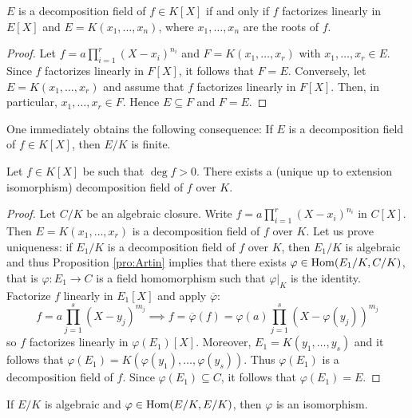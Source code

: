 \begin{proposition}
	$E$ is a decomposition field of $f\in K[X]$ if and only if
	$f$ factorizes linearly in $E[X]$ and $E=K(x_1,\dots,x_n)$, where 
	$x_1,\dots,x_n$ are the roots of $f$. 
\end{proposition}

\begin{proof}
    Let $f=a\prod_{i=1}^r(X-x_i)^{n_i}$ and $F=K(x_1,\dots,x_r)$ with $x_1,\dots,x_r\in E$. Since $f$
    factorizes linearly in $F[X]$, it follows that $F=E$. 
    Conversely, let $E=K(x_1,\dots,x_r)$ and assume that $f$ factorizes linearly
    in $F[X]$. Then, in particular, $x_1,\dots,x_r\in F$. Hence $E\subseteq F$ and
    $F=E$. 
\end{proof}

One immediately obtains the following consequence:
If $E$ is a decomposition field of $f\in K[X]$, then $E/K$ is finite. 

\begin{theorem}
    Let $f\in K[X]$ be such that $\deg f>0$. There exists a (unique up to extension isomorphism) 
    decomposition field of $f$ over $K$. 
\end{theorem}

\begin{proof}
    Let $C/K$ be an algebraic closure. Write $f=a\prod_{i=1}^r(X-x_i)^{n_i}$ in $C[X]$. 
    Then $E=K(x_1,\dots,x_r)$ is a decomposition field of $f$ over $K$. Let us prove
    uniqueness: if $E_1/K$ is a decomposition field of $f$ over $K$, 
    then $E_1/K$ is algebraic and thus Proposition
    \ref{pro:Artin} implies that 
    there exists $\varphi\in\operatorname{Hom}(E_1/K,C/K)$, that is $\varphi\colon E_1\to C$ is a field
    homomorphism such that $\varphi|_K$ is the identity.
    Factorize $f$ linearly in $E_1[X]$ and apply $\overline{\varphi}$:
    \[
    f=a\prod_{j=1}^s(X-y_j)^{m_j}
    \implies
    f=\overline{\varphi}(f)=\varphi(a)\prod_{j=1}^s(X-\varphi(y_j))^{m_j}
    \]
    so $f$ factorizes linearly in $\varphi(E_1)[X]$. Moreover, 
    $E_1=K(y_1,\dots,y_s)$ and it follows that 
    $\varphi(E_1)=K(\varphi(y_1),\dots,\varphi(y_s))$. Thus
    $\varphi(E_1)$ is a decomposition field of $f$. Since  
    $\varphi(E_1)\subseteq C$, it follows that $\varphi(E_1)=E$. 
\end{proof}

\begin{exercise}
\label{xca:algebraic_bijective}
If $E/K$ is algebraic and $\varphi\in\operatorname{Hom}(E/K,E/K)$, 
then $\varphi$ is an isomorphism. 
\end{exercise}


